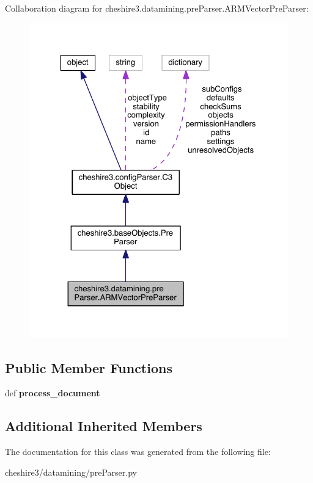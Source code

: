 Collaboration diagram for cheshire3.\-datamining.\-pre\-Parser.\-A\-R\-M\-Vector\-Pre\-Parser\-:
\nopagebreak
\begin{figure}[H]
\begin{center}
\leavevmode
\includegraphics[width=325pt]{classcheshire3_1_1datamining_1_1pre_parser_1_1_a_r_m_vector_pre_parser__coll__graph}
\end{center}
\end{figure}
\subsection*{Public Member Functions}
\begin{DoxyCompactItemize}
\item 
\hypertarget{classcheshire3_1_1datamining_1_1pre_parser_1_1_a_r_m_vector_pre_parser_ae229a842d1fe02a79b0e9375bdb0f962}{def {\bfseries process\-\_\-document}}\label{classcheshire3_1_1datamining_1_1pre_parser_1_1_a_r_m_vector_pre_parser_ae229a842d1fe02a79b0e9375bdb0f962}

\end{DoxyCompactItemize}
\subsection*{Additional Inherited Members}


The documentation for this class was generated from the following file\-:\begin{DoxyCompactItemize}
\item 
cheshire3/datamining/pre\-Parser.\-py\end{DoxyCompactItemize}
